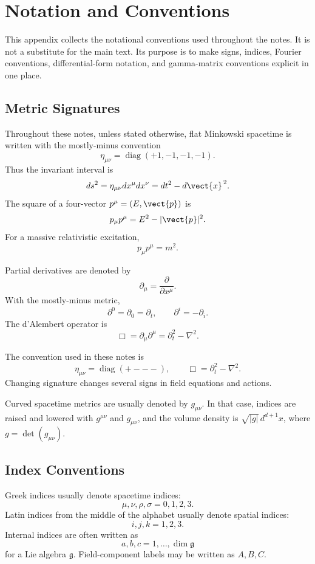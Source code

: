 \chapter{Notation and Conventions}

\begin{remarkbox}
This appendix collects the notational conventions used throughout the notes. It
is not a substitute for the main text. Its purpose is to make signs, indices,
Fourier conventions, differential-form notation, and gamma-matrix conventions
explicit in one place.
\end{remarkbox}

\section{Metric Signatures}

Throughout these notes, unless stated otherwise, flat Minkowski spacetime is
written with the mostly-minus convention
\[
    \eta_{\mu\nu}=\operatorname{diag}(+1,-1,-1,-1).
\]
Thus the invariant interval is
\[
    ds^2=\eta_{\mu\nu}dx^\mu dx^\nu=dt^2-d\vect{x}^{\,2}.
\]
The square of a four-vector \(p^\mu=(E,\vect{p})\) is
\[
    p_\mu p^\mu=E^2-|\vect{p}|^2.
\]
For a massive relativistic excitation,
\[
    p_\mu p^\mu=m^2.
\]

Partial derivatives are denoted by
\[
    \partial_\mu=\frac{\partial}{\partial x^\mu}.
\]
With the mostly-minus metric,
\[
    \partial^0=\partial_0=\partial_t,
    \qquad
    \partial^i=-\partial_i.
\]
The d'Alembert operator is
\[
    \Box=\partial_\mu\partial^\mu=\partial_t^2-\nabla^2.
\]

\begin{definitionbox}
The convention used in these notes is
\[
    \eta_{\mu\nu}=\operatorname{diag}(+---),
    \qquad
    \Box=\partial_t^2-\nabla^2.
\]
Changing signature changes several signs in field equations and actions.
\end{definitionbox}

Curved spacetime metrics are usually denoted by \(g_{\mu\nu}\). In that case,
indices are raised and lowered with \(g^{\mu\nu}\) and \(g_{\mu\nu}\), and the
volume density is \(\sqrt{|g|}\,d^{d+1}x\), where \(g=\det(g_{\mu\nu})\).

\section{Index Conventions}

Greek indices usually denote spacetime indices:
\[
    \mu,\nu,\rho,\sigma=0,1,2,3.
\]
Latin indices from the middle of the alphabet usually denote spatial indices:
\[
    i,j,k=1,2,3.
\]
Internal indices are often written as
\[
    a,b,c=1,\ldots,\dim\mathfrak{g}
\]
for a Lie algebra \(\mathfrak{g}\). Field-component labels may be written as
\(A,B,C\).

